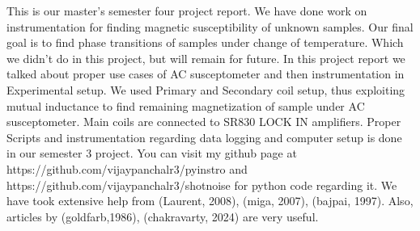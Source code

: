 This is our master’s semester four project report. We have done work on instrumentation for finding magnetic susceptibility of unknown samples. Our final goal is to find phase transitions of samples under change of temperature. Which we didn’t do in this project, but will remain for future. In this project report we talked about proper use cases of AC susceptometer and then instrumentation in Experimental setup. We used Primary and Secondary coil setup, thus exploiting mutual inductance to find remaining magnetization of sample under AC susceptometer. Main coils are connected to SR830 LOCK IN amplifiers. Proper Scripts and instrumentation regarding data logging and computer setup is done in our semester 3 project\cite{Panchal2024gb}\cite{Panchal}. You can visit my github page at https://github.com/vijaypanchalr3/pyinstro and https://github.com/vijaypanchalr3/shotnoise for python code regarding it. We have took extensive help from (Laurent, 2008)\cite{cambr}, (miga, 2007)\cite{10.1063/1.2712792}, (bajpai, 1997)\cite{10.1063/1.1148349}. Also, articles by (goldfarb,1986)\cite{10.1063/1.1137813}, (chakravarty, 2024)\cite{10.1063/5.0182471} are very useful.
